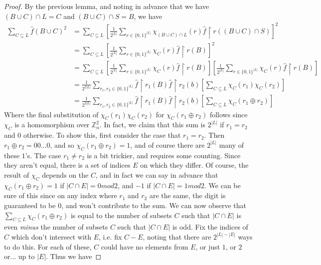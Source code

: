 \documentclass{article}
\theoremstyle{definition}
\theoremstyle{plain}
\theoremstyle{theorem}
\begin{document}
\begin{proof}
By the previous lemma, and noting in advance that we have $(B \cup C) \cap L = C$ and $(B \cup C) \cap S = B$, we have
\begin{align}
	\sum_{C \subseteq L} \hat{f}(B \cup C)^2 &= \sum_{C \subseteq L} \left[ \frac{1}{2^{|L|}} \sum_{r \in \{0,1\}^{|L|}} \chi_{(B \cup C) \cap L}(r) \hat{f}\restriction r((B\cup C) \cap S) \right]^2 \\
	&= \sum_{C \subseteq L} \left[ \frac{1}{2^{|L|}} \sum_{r \in \{0,1\}^{|L|}} \chi_C(r) \hat{f}\restriction r(B) \right]^2 \\
	&= \sum_{C \subseteq L} \left[ \frac{1}{2^{|L|}} \sum_{r \in \{0,1\}^{|L|}} \chi_C(r) \hat{f}\restriction r(B) \right]\left[ \frac{1}{2^{|L|}} \sum_{r \in \{0,1\}^{|L|}} \chi_C(r) \hat{f}\restriction r(B) \right] \\
	&= \frac{1}{2^{2|L|}} \sum_{r_1,r_2 \in \{0,1\}^{|L|}} \hat{f}\restriction r_1(B) \hat{f}\restriction r_2(b) \left[ \sum_{C \subseteq L} \chi_C(r_1)\chi_C(r_2) \right] \\
	&= \frac{1}{2^{2|L|}} \sum_{r_1,r_2 \in \{0,1\}^{|L|}} \hat{f}\restriction r_1(B) \hat{f}\restriction r_2(b) \left[ \sum_{C \subseteq L} \chi_C(r_1 \oplus r_2) \right] 
\end{align}
Where the final substitution of $ \chi_C(r_1)\chi_C(r_2)$ for $\chi_C(r_1 \oplus r_2)$ follows since $\chi_C$ is a homomorphism over $\mathbb{Z}_n^2$. In fact, we claim that this sum is $2^{|L|}$ if $r_1 = r_2$ and $0$ otherwise. To show this, first consider the case that $r_1 = r_2$. Then $r_1 \oplus r_2 = 00\ldots0$, and so $\chi_C(r_1 \oplus r_2) = 1$, and of course there are $2^{|L|}$ many of these $1$'s. The case $r_1 \neq r_2$ is a bit trickier, and requires some counting. Since they aren't equal, there is a set of indices $E$ on which they differ. Of course, the result of $\chi_C$ depends on the $C$, and in fact we can say in advance that $\chi_C(r_1 \oplus r_2) = 1$ if $|C \cap E| = 0mod2$, and $-1$ if $|C \cap E| = 1mod2$. We can be sure of this since on any index where $r_1$ and $r_2$ are the same, the digit is guaranteed to be $0$, and won't contribute to the sum. We can now observe that $\sum_{C \subseteq L} \chi_C(r_1 \oplus r_2)$ is equal to the number of subsets $C$ such that $|C \cap E|$ is even \emph{minus} the number of subsets $C$ such that $|C \cap E|$ is odd. Fix the indices of $C$ which don't intersect with $E$, i.e. fix $C-E$, noting that there are $2^{|L|-|E|}$ ways to do this. For each of these, $C$ could have no elements from $E$, or just $1$, or $2$ or... up to $|E|$. Thus we have

\end{proof}
\end{document}
